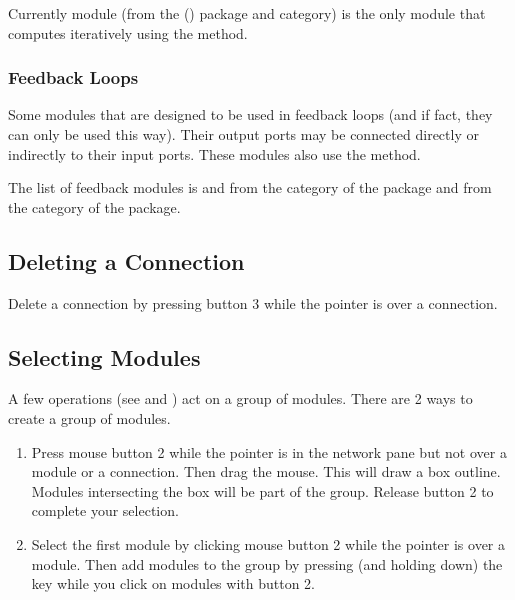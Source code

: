 Currently module  (from the \package(\sr) package and
 category) is the only module that computes iteratively
using the  method.

\subsubsection{Feedback Loops}

Some modules that are designed to be used in feedback loops (and if fact,
they can only be used this way).  Their output ports may be connected
directly or indirectly to their input ports.  These modules also use the
 method.

The list of feedback modules is  and
 from the  category of the
 package and  from the
 category of the  package.

\subsection{Deleting a Connection}
\label{sec:deleteconnections}

Delete a connection by pressing button 3 while the pointer is
over a connection.

\subsection{Selecting Modules}
\label{sec:selectmods}

A few operations (see  and
) act on a group of
modules.  There are 2 ways to create a group of modules.

\begin{enumerate}
\item Press mouse button 2 while the pointer is in the network pane but not over
a module or a connection.  Then drag the mouse.  This will draw a box
outline.  Modules intersecting the box will be part of the group.  Release
button 2 to complete your selection.
\item Select the first module by clicking mouse button 2 while the pointer is
over a module.  Then add modules to the group by pressing (and holding
down) the  key while you click on modules with button 2.
\end{enumerate}

